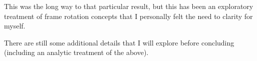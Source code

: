 This was the long way to that particular result, but this has been
an exploratory treatment of frame rotation concepts that I personally 
felt the need to clarity for myself.

There are still some additional details that I will explore before concluding
(including an analytic treatment of the above).


